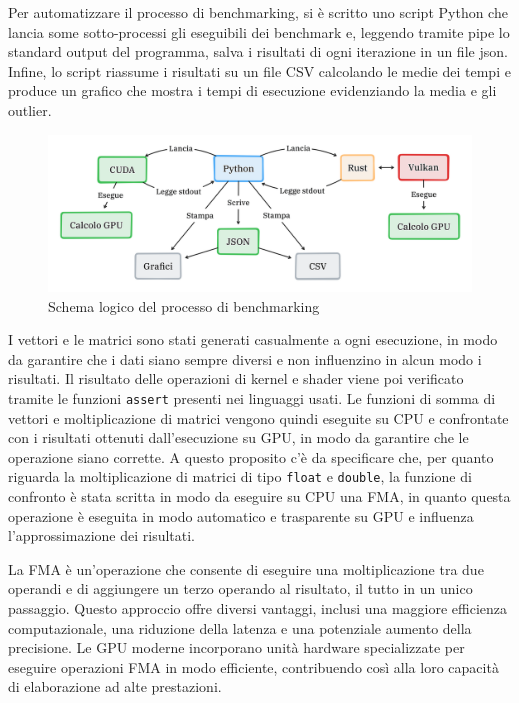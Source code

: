 Per automatizzare il processo di benchmarking, si è scritto uno script Python che lancia some sotto-processi gli eseguibili dei benchmark e, leggendo tramite pipe lo standard output del programma, salva i risultati di ogni iterazione in un file json. Infine, lo script riassume i risultati su un file CSV calcolando le medie dei tempi e produce un grafico che mostra i tempi di esecuzione evidenziando la media e gli outlier.

\begin{figure}[ht]
  \centering
  \includegraphics[width=1\linewidth]{images/chapter4/arch_bench.png}
  \caption{Schema logico del processo di benchmarking}
  \label{fig:arch_bench}
\end{figure}


I vettori e le matrici sono stati generati casualmente a ogni esecuzione, in modo da garantire che i dati siano sempre diversi e non influenzino in alcun modo i risultati. Il risultato delle operazioni di kernel e shader viene poi verificato tramite le funzioni \verb|assert| presenti nei linguaggi usati. Le funzioni di somma di vettori e moltiplicazione di matrici vengono quindi eseguite su CPU e confrontate con i risultati ottenuti dall'esecuzione su GPU, in modo da garantire che le operazione siano corrette. A questo proposito c'è da specificare che, per quanto riguarda la moltiplicazione di matrici di tipo \verb|float| e \verb|double|, la funzione di confronto è stata scritta in modo da eseguire su CPU una \gls{FMA}, in quanto questa operazione è eseguita in modo automatico e trasparente su GPU e influenza l'approssimazione dei risultati. 


La FMA è un'operazione che consente di eseguire una moltiplicazione tra due operandi e di aggiungere un terzo operando al risultato, il tutto in un unico passaggio. Questo approccio offre diversi vantaggi, inclusi una maggiore efficienza computazionale, una riduzione della latenza e una potenziale aumento della precisione. Le GPU moderne incorporano unità hardware specializzate per eseguire operazioni FMA in modo efficiente, contribuendo così alla loro capacità di elaborazione ad alte prestazioni. 

